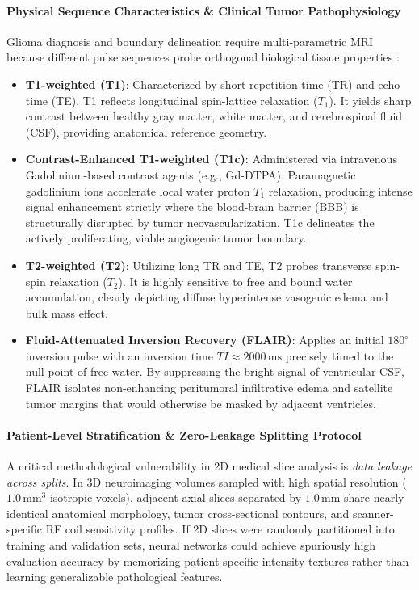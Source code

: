 \documentclass{article}
\begin{document}
\paragraph{Physical Sequence Characteristics \& Clinical Tumor Pathophysiology}
Glioma diagnosis and boundary delineation require multi-parametric MRI because different pulse sequences probe orthogonal biological tissue properties \citep{brats2024}:
\begin{itemize}
    \item \textbf{T1-weighted (T1)}: Characterized by short repetition time (TR) and echo time (TE), T1 reflects longitudinal spin-lattice relaxation ($T_1$). It yields sharp contrast between healthy gray matter, white matter, and cerebrospinal fluid (CSF), providing anatomical reference geometry.
    \item \textbf{Contrast-Enhanced T1-weighted (T1c)}: Administered via intravenous Gadolinium-based contrast agents (e.g., Gd-DTPA). Paramagnetic gadolinium ions accelerate local water proton $T_1$ relaxation, producing intense signal enhancement strictly where the blood-brain barrier (BBB) is structurally disrupted by tumor neovascularization. T1c delineates the actively proliferating, viable angiogenic tumor boundary.
    \item \textbf{T2-weighted (T2)}: Utilizing long TR and TE, T2 probes transverse spin-spin relaxation ($T_2$). It is highly sensitive to free and bound water accumulation, clearly depicting diffuse hyperintense vasogenic edema and bulk mass effect.
    \item \textbf{Fluid-Attenuated Inversion Recovery (FLAIR)}: Applies an initial $180^\circ$ inversion pulse with an inversion time $TI \approx 2000\,\text{ms}$ precisely timed to the null point of free water. By suppressing the bright signal of ventricular CSF, FLAIR isolates non-enhancing peritumoral infiltrative edema and satellite tumor margins that would otherwise be masked by adjacent ventricles.
\end{itemize}

\paragraph{Patient-Level Stratification \& Zero-Leakage Splitting Protocol}
A critical methodological vulnerability in 2D medical slice analysis is \emph{data leakage across splits}. In 3D neuroimaging volumes sampled with high spatial resolution ($1.0\,\text{mm}^3$ isotropic voxels), adjacent axial slices separated by $1.0\,\text{mm}$ share nearly identical anatomical morphology, tumor cross-sectional contours, and scanner-specific RF coil sensitivity profiles. If 2D slices were randomly partitioned into training and validation sets, neural networks could achieve spuriously high evaluation accuracy by memorizing patient-specific intensity textures rather than learning generalizable pathological features.
\end{document}
